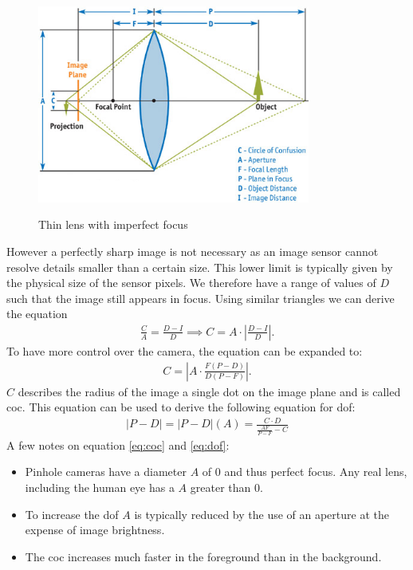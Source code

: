 \begin{figure}[h]
    \centering
    \includegraphics[width=0.8\textwidth]{images/fig23-02_1.png}
    \caption{Thin lens with imperfect focus}
    \label{fig:coc-thin-lens}
    \cite{Demers.2005}
\end{figure}
However a perfectly sharp image is not necessary as an image sensor cannot resolve details smaller than a certain size.
This lower limit is typically given by the physical size of the sensor pixels.
We therefore have a range of values of $D$ such that the image still appears in focus.
Using similar triangles we can derive the equation
\begin{align}
    \frac{C}{A} = \frac{D-I}{D} \implies C = A \cdot |\frac{D-I}{D}|.
    \label{eq:coc}
\end{align}
To have more control over the camera, the equation can be expanded to:
\begin{align}
    C = | A \cdot \frac{F(P-D)}{D(P-F)}|.
    \label{eq:coc-expanded}
\end{align}
$C$ describes the radius of the image a single dot on the image plane and is called \gls{coc}.
This equation can be used to derive the following equation for \gls{dof}:
\begin{align}
    |P-D| = |P-D|(A) = \frac{C \cdot D}{\frac{A F}{P-F} - C}
    \label{eq:dof}
\end{align}
A few notes on equation \ref{eq:coc} and \ref{eq:dof}:
\begin{itemize}
    \item Pinhole cameras have a diameter $A$ of 0 and thus perfect focus. Any real lens, including the human eye has a $A$ greater than 0.
    \item To increase the \gls{dof} $A$ is typically reduced by the use of an aperture at the expense of image brightness.
    \item The \gls{coc} increases much faster in the foreground than in the background.
\end{itemize}

